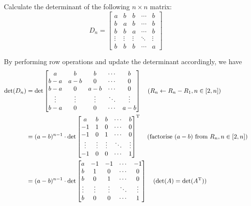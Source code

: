 \question Calculate the determinant of the following $n\times n$ matrix:
\[
    D_n = \begin{bmatrix}
        a & b & b & \cdots & b \\
        b & a & b & \cdots & b \\
        b & b & a & \cdots & b \\
        \vdots & \vdots & \vdots & \ddots & \vdots \\
        b & b & b & \cdots & a
    \end{bmatrix}
\]

\begin{solution}
    By performing row operations and update the determinant accordingly, we have
    \begin{align*}
        \det(D_n) &=
        \det\begin{bmatrix}
            a & b & b & \cdots & b \\
            b-a & a-b & 0 & \cdots & 0 \\
            b-a & 0 & a-b & \cdots & 0 \\
            \vdots & \vdots & \vdots & \ddots & \vdots \\
            b-a & 0 & 0 & \cdots & a-b
        \end{bmatrix} \quad (R_n\leftarrow R_n-R_1, n\in[2,n]) \\
        &= (a-b)^{n-1} \cdot \det\trans{\begin{bmatrix}
            a & b & b & \cdots & b \\
            -1 & 1 & 0 & \cdots & 0 \\
            -1 & 0 & 1 & \cdots & 0 \\
            \vdots & \vdots & \vdots & \ddots & \vdots \\
            -1 & 0 & 0 & \cdots & 1
        \end{bmatrix}} \quad (\text{factorise } (a-b) \text{ from } R_n, n\in[2,n]) \\
        &= (a-b)^{n-1} \cdot \det\begin{bmatrix}
            a & -1 & -1 & \cdots & -1 \\
            b & 1 & 0 & \cdots & 0 \\
            b & 0 & 1 & \cdots & 0 \\
            \vdots & \vdots & \vdots & \ddots & \vdots \\
            b & 0 & 0 & \cdots & 1
        \end{bmatrix} \quad (\det(A)=\det(\trans{A})) \\

\end{align*}
\end{solution}
